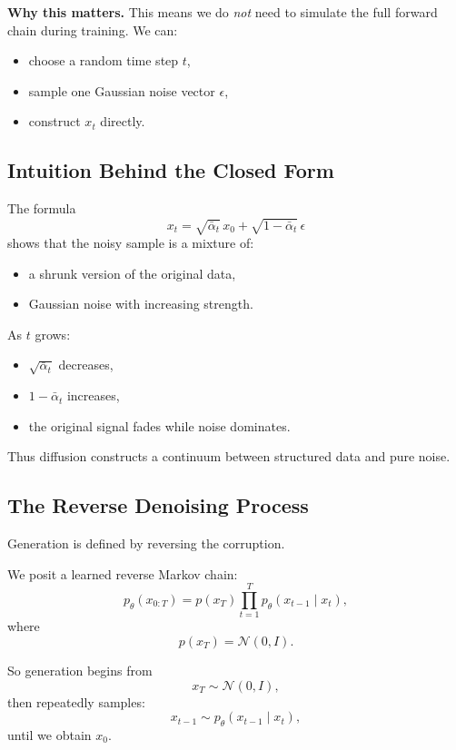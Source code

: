 \noindent
\textbf{Why this matters.}
This means we do \emph{not} need to simulate the full forward chain during training. We can:
\begin{itemize}
    \item choose a random time step $t$,
    \item sample one Gaussian noise vector $\epsilon$,
    \item construct $x_t$ directly.
\end{itemize}

\subsection{Intuition Behind the Closed Form}

The formula
\[
x_t = \sqrt{\bar{\alpha}_t}\,x_0 + \sqrt{1-\bar{\alpha}_t}\,\epsilon
\]
shows that the noisy sample is a mixture of:
\begin{itemize}
    \item a shrunk version of the original data,
    \item Gaussian noise with increasing strength.
\end{itemize}

\medskip

\noindent
As $t$ grows:
\begin{itemize}
    \item $\sqrt{\bar{\alpha}_t}$ decreases,
    \item $1-\bar{\alpha}_t$ increases,
    \item the original signal fades while noise dominates.
\end{itemize}

\medskip

\noindent
Thus diffusion constructs a continuum between structured data and pure noise.

\subsection{The Reverse Denoising Process}

Generation is defined by reversing the corruption.

\medskip

\noindent
We posit a learned reverse Markov chain:
\[
p_\theta(x_{0:T})
=
p(x_T)\prod_{t=1}^T p_\theta(x_{t-1}\mid x_t),
\]
where
\[
p(x_T)=\mathcal{N}(0,I).
\]

\medskip

\noindent
So generation begins from
\[
x_T \sim \mathcal{N}(0,I),
\]
then repeatedly samples:
\[
x_{t-1} \sim p_\theta(x_{t-1}\mid x_t),
\]
until we obtain $x_0$.

